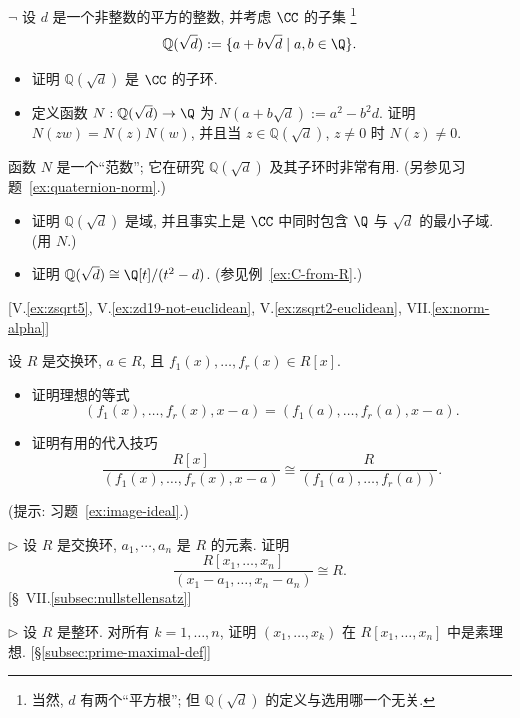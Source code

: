 \begin{prob}
\label{ex:Q-sqrt-d}
$\neg$ 设 $d$ 是一个非整数的平方的整数, 并考虑 $\CC$ 的子集%
\footnote{当然, $d$ 有两个``平方根''; 但 $\mathbb{Q}(\sqrt{d})$ 的定义与选用哪一个无关.}%
\[
\mathbb{Q}(\sqrt{d}) := \{a + b\sqrt{d} \mid a, b \in \Q\}.
\]
\begin{itemize}
	\item 证明 $\mathbb{Q}(\sqrt{d})$ 是 $\CC$ 的子环.
	\item 定义函数 $N : \mathbb{Q}(\sqrt{d}) \to \Q$ 为 $N(a + b\sqrt{d}) := a^2 - b^2 d$. 证明 $N(zw) = N(z)N(w)$, 并且当 $z \in \mathbb{Q}(\sqrt{d})$, $z \neq 0$ 时 $N(z) \neq 0$.
\end{itemize}
函数 $N$ 是一个``范数''; 它在研究 $\mathbb{Q}(\sqrt{d})$ 及其子环时非常有用. (另参见习题~\ref{ex:quaternion-norm}.)
\begin{itemize}
	\item 证明 $\mathbb{Q}(\sqrt{d})$ 是域, 并且事实上是 $\CC$ 中同时包含 $\Q$ 与 $\sqrt{d}$ 的最小子域. (用 $N$.)
	\item 证明 $\mathbb{Q}(\sqrt{d}) \cong \Q[t]/(t^2 - d)$. (参见例~\ref{ex:C-from-R}.)
\end{itemize}
[V.\ref{ex:zsqrt5}, V.\ref{ex:zd19-not-euclidean}, V.\ref{ex:zsqrt2-euclidean}, VII.\ref{ex:norm-alpha}]
\end{prob}

\begin{prob}
\label{ex:substitution-trick}
设 $R$ 是交换环, $a \in R$, 且 $f_1(x), \ldots, f_r(x) \in R[x]$.
\begin{itemize}
	\item 证明理想的等式
	\[
	(f_1(x), \dots, f_r(x), x - a) = (f_1(a), \dots, f_r(a), x - a).
	\]
	\item 证明有用的代入技巧
	\[
	\frac{R[x]}{(f_1(x), \ldots, f_r(x), x - a)} \cong \frac{R}{(f_1(a), \ldots, f_r(a))}.
	\]
\end{itemize}
(提示: 习题~\ref{ex:image-ideal}.)
\end{prob}

\begin{prob}
\label{ex:quotient-poly-eval}
$\triangleright$ 设 $R$ 是交换环, $a_1, \cdots, a_n$ 是 $R$ 的元素. 证明
\[
\frac{R[x_1, \ldots, x_n]}{(x_1 - a_1, \ldots, x_n - a_n)} \cong R.
\]
[\S~VII.\ref{subsec:nullstellensatz}]
\end{prob}

\begin{prob}
\label{ex:chain-prime}
$\triangleright$ 设 $R$ 是整环. 对所有 $k = 1, \ldots, n$, 证明 $(x_1, \ldots, x_k)$ 在 $R[x_1, \ldots, x_n]$ 中是素理想. [\S\ref{subsec:prime-maximal-def}]
\end{prob}

